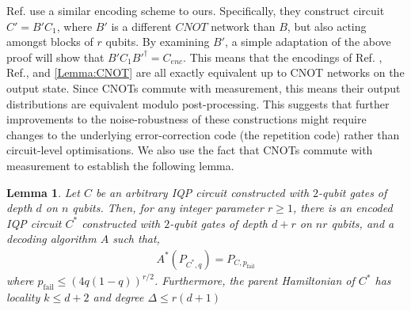 \documentclass[a4paper,onecolumn,11pt,accepted=2017-05-09]{quantumarticle}
\newcommand{\pfail}{p_{\text{fail}}}
\newtheorem{lemma}[theorem]{Lemma}
\begin{document}
Ref. \cite{bergamaschi2024sample}  use a similar encoding scheme to ours. 
Specifically, they construct circuit $C' =  B'C_1$, where $B'$ is a different $CNOT$ network than $B$, but also acting amongst blocks of $r$ qubits. 
By examining $B'$, a simple adaptation of the above proof will show that $B' C_1 B'^\dagger = C_{enc}$. This means that the encodings of Ref. \cite{Bremner_2017}, Ref.\cite[Lemma 8.1]{bergamaschi2024sample}, and \cref{Lemma:CNOT} are all exactly equivalent up to CNOT networks on the output state. 
Since CNOTs commute with measurement, this means their output distributions are equivalent modulo post-processing. This suggests that further improvements to the noise-robustness of these constructions might require changes to the underlying error-correction code (the repetition code) rather than circuit-level optimisations. We also use the fact that CNOTs commute with measurement to establish the following lemma.
\begin{lemma} \label{Lemma:CNOT_Encoding}
Let $C$ be an arbitrary IQP circuit constructed with $2$-qubit gates of depth $d$ on $n$ qubits. Then, for any integer parameter $r \geq 1$, there is an encoded IQP circuit $C^*$ constructed with $2$-qubit gates of depth $d+r$ on $nr$ qubits, and a decoding algorithm $A$ such that,
\begin{align}
    A^*(P_{C^*,q}) = P_{C,\pfail}
\end{align}
where $\pfail \leq (4q(1-q))^{r/2}$. Furthermore, the parent Hamiltonian of $C^*$ has locality $k \leq d+2$ and degree $\Delta \leq r(d+1)$
\end{lemma}
\end{document}
